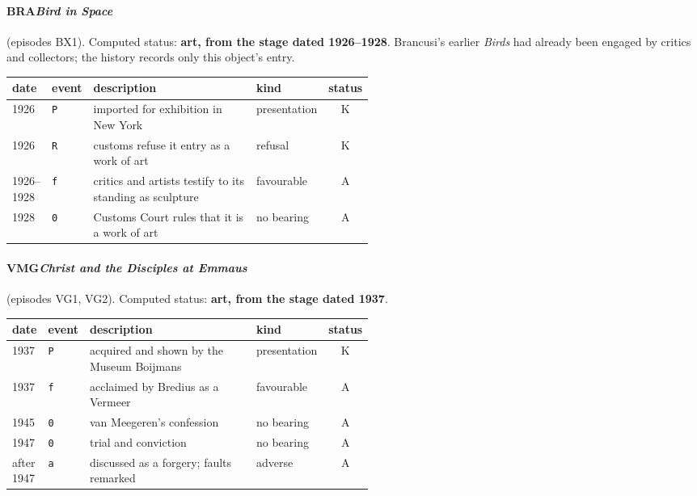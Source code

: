 \paragraph{BRA\enspace \emph{Bird in Space}} (episodes BX1). Computed status: \textbf{art, from the stage dated 1926--1928}. Brancusi's earlier \emph{Birds} had already been engaged by critics and collectors; the history records only this object's entry.
\begin{center}\footnotesize\begin{tabular}{@{}llp{0.52\linewidth}lc@{}}
date & event & description & kind & status \\ \midrule
1926 & \texttt{P} & imported for exhibition in New York & presentation & K \\
1926 & \texttt{R} & customs refuse it entry as a work of art & refusal & K \\
1926--1928 & \texttt{f} & critics and artists testify to its standing as sculpture & favourable & A \\
1928 & \texttt{0} & Customs Court rules that it is a work of art & no bearing & A \\
\end{tabular}\end{center}

\paragraph{VMG\enspace \emph{Christ and the Disciples at Emmaus}} (episodes VG1, VG2). Computed status: \textbf{art, from the stage dated 1937}.
\begin{center}\footnotesize\begin{tabular}{@{}llp{0.52\linewidth}lc@{}}
date & event & description & kind & status \\ \midrule
1937 & \texttt{P} & acquired and shown by the Museum Boijmans & presentation & K \\
1937 & \texttt{f} & acclaimed by Bredius as a Vermeer & favourable & A \\
1945 & \texttt{0} & van Meegeren's confession & no bearing & A \\
1947 & \texttt{0} & trial and conviction & no bearing & A \\
after 1947 & \texttt{a} & discussed as a forgery; faults remarked & adverse & A \\
\end{tabular}\end{center}


